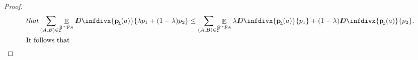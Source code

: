 \documentclass[letterpaper]{article} %
\theoremstyle{plain}
\theoremstyle{definition}
\theoremstyle{remark}
\newcommand{\thickD}{I\mkern-8muD}
\newcommand{\kldiv}{\thickD\infdivx}
\DeclareMathOperator*{\E}{\mathbb{E}} %
\newcommand\mat[1]{\mathbf{#1}}
\newcommand{\bp}[1][L]{\mat{p}_{\!_{#1}\!}}
\newcommand{\Ed}{\mathcal E}
\begin{document}
\begin{proof}
\begin{align*}
{                        that}
					\sum_{(A, B) \in \Ed}\mskip-10mu\E_{a\sim p_A} \kldiv{\bp(a) }{\lambda p_1 + (1-\lambda) p_2} 
			&\leq \sum_{(A, B) \in
							  \Ed}\mskip-10mu\E_{a\sim p_A}\lambda
							\kldiv{\bp(a)}{p_1} + (1-\lambda)
							\kldiv{\bp(a)}{p_2}. \\
%
    \shortintertext{It follows that} 

\end{align*}
\end{proof}
\end{document}
